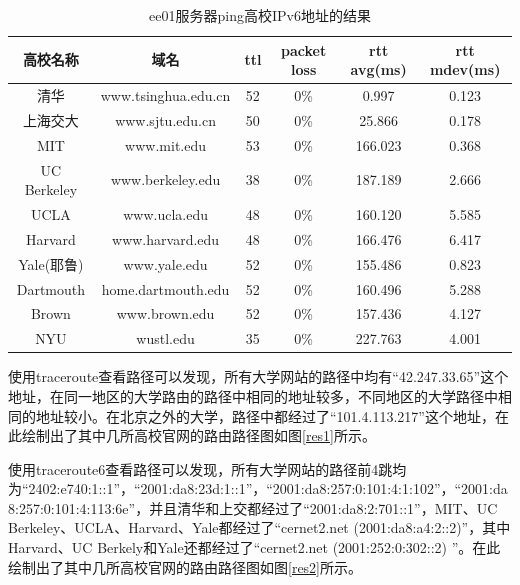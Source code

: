\documentclass[12pt,letterpaper]{article}
\begin{document}
\begin{table}[!h]
	\centering
	\caption{\label{tab5}ee01服务器ping高校IPv6地址的结果}
	\begin{tabular}{|c|c|c|c|c|c|}
		\hline
		高校名称 & 域名 & ttl & packet loss & rtt avg(ms) & rtt mdev(ms) \\
		\hline
		清华 & www.tsinghua.edu.cn & 52 & 0\%& 0.997 & 0.123 \\
		\hline
		上海交大 & www.sjtu.edu.cn & 50 & 0\%& 25.866 & 0.178 \\
		\hline
		MIT & www.mit.edu & 53 & 0\% & 166.023 & 0.368 \\
		\hline
		UC Berkeley & www.berkeley.edu & 38 & 0\% & 187.189 & 2.666 \\
		\hline
		UCLA & www.ucla.edu & 48 & 0\% & 160.120 & 5.585\\
		\hline
		Harvard & www.harvard.edu & 48 & 0\% & 166.476 & 6.417 \\
		\hline
		Yale(耶鲁) & www.yale.edu & 52 & 0\% & 155.486 & 0.823 \\
		\hline
		Dartmouth & home.dartmouth.edu & 52 & 0\% & 160.496 & 5.288 \\
		\hline
		Brown & www.brown.edu & 52 & 0\% & 157.436 & 4.127 \\
		\hline
		NYU & wustl.edu & 35 & 0\% & 227.763 & 4.001 \\
		\hline
	\end{tabular}
\end{table}

使用traceroute查看路径可以发现，所有大学网站的路径中均有``42.247.33.65''这个地址，在同一地区的大学路由的路径中相同的地址较多，不同地区的大学路径中相同的地址较小。在北京之外的大学，路径中都经过了``101.4.113.217''这个地址，在此绘制出了其中几所高校官网的路由路径图如图\ref{res1}所示。

使用traceroute6查看路径可以发现，所有大学网站的路径前4跳均为``2402:e740:1::1''，``2001:da8:23d:1::1''，``2001:da8:257:0:101:4:1:102''，``2001:da8:257:0:101:4:113:6e''，并且清华和上交都经过了``2001:da8:2:701::1''，MIT、UC Berkeley、UCLA、Harvard、Yale都经过了``cernet2.net (2001:da8:a4:2::2)''，其中Harvard、UC Berkely和Yale还都经过了``cernet2.net (2001:252:0:302::2)
''。在此绘制出了其中几所高校官网的路由路径图如图\ref{res2}所示。
\end{document}
